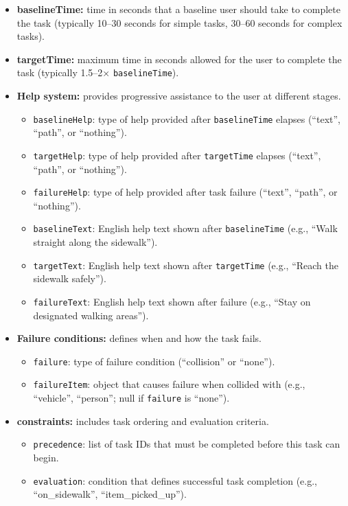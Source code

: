 \documentclass{article}
\begin{document}
\begin{itemize}
    \item \textbf{baselineTime:} time in seconds that a baseline user should take to complete the task (typically 10--30 seconds for simple tasks, 30--60 seconds for complex tasks).
    
    \item \textbf{targetTime:} maximum time in seconds allowed for the user to complete the task (typically 1.5--2× \texttt{baselineTime}).
    
    \item \textbf{Help system:} provides progressive assistance to the user at different stages.
    \begin{itemize}
        \item \texttt{baselineHelp}: type of help provided after \texttt{baselineTime} elapses (``text'', ``path'', or ``nothing'').
        \item \texttt{targetHelp}: type of help provided after \texttt{targetTime} elapses (``text'', ``path'', or ``nothing'').
        \item \texttt{failureHelp}: type of help provided after task failure (``text'', ``path'', or ``nothing'').
        \item \texttt{baselineText}: English help text shown after \texttt{baselineTime} (e.g., ``Walk straight along the sidewalk'').
        \item \texttt{targetText}: English help text shown after \texttt{targetTime} (e.g., ``Reach the sidewalk safely'').
        \item \texttt{failureText}: English help text shown after failure (e.g., ``Stay on designated walking areas'').
    \end{itemize}
    
    \item \textbf{Failure conditions:} defines when and how the task fails.
    \begin{itemize}
        \item \texttt{failure}: type of failure condition (``collision'' or ``none'').
        \item \texttt{failureItem}: object that causes failure when collided with (e.g., ``vehicle'', ``person''; null if \texttt{failure} is ``none'').
    \end{itemize}
    
    \item \textbf{constraints:} includes task ordering and evaluation criteria.
    \begin{itemize}
        \item \texttt{precedence}: list of task IDs that must be completed before this task can begin.
        \item \texttt{evaluation}: condition that defines successful task completion (e.g., ``on\_sidewalk'', ``item\_picked\_up'').
    \end{itemize}
    

\end{itemize}
\end{document}
